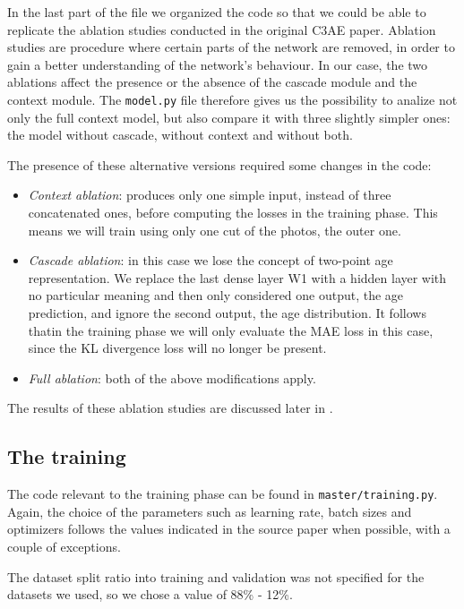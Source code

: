 In the last part of the file we organized the code so that we could be able to replicate the ablation
studies conducted in the original C3AE paper. Ablation studies are procedure where certain parts of the 
network are removed, in order to gain a better understanding of the network’s behaviour. In our case, 
the two ablations affect the presence or the absence of the cascade module and the context module.
The \texttt{model.py} file therefore gives us the possibility to analize not only the full context 
model, but also compare it with three slightly simpler ones: the model without cascade, without context 
and without both.

The presence of these alternative versions required some changes in the code:

\begin{itemize}
    \item \textit{Context ablation}: produces only one simple input, instead of three concatenated ones, 
    before computing the losses in the training phase. This means we will train using only one cut of the 
    photos, the outer one.
    \item \textit{Cascade ablation}: in this case we lose the concept of two-point age representation.
    We replace the last dense layer W1 with a hidden layer with no particular meaning and then only
    considered one output, the age prediction, and ignore the second output, the age distribution.
    It follows thatin the training phase we will only evaluate the MAE loss in this case, since the KL 
    divergence loss will no longer be present. 
    \item \textit{Full ablation}: both of the above modifications apply.
\end{itemize}

The results of these ablation studies are discussed later in .

\subsection*{The training}
The code relevant to the training phase can be found in \texttt{master/training.py}. Again, the choice of
the parameters such as learning rate, batch sizes and optimizers follows the values indicated in the source 
paper when possible, with a couple of exceptions.

The dataset split ratio into training and validation was not specified for the datasets we used, so we 
chose a value of 88\% - 12\%.

